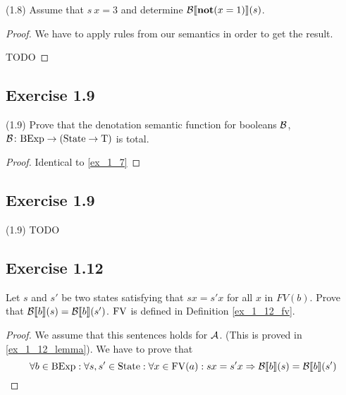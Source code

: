 \documentclass[12pt,a4paper,oneside]{book}
\begin{document}
\begin{exercise}{(1.8)}
    Assume that $s\ x = 3$ and determine $\mathcal{B} \llbracket \mathop{\textbf{\textup{not}}}(x = 1) \rrbracket (s)$.
    
    \begin{proof}
        We have to apply rules from our semantics in order to get the result.
        
        TODO
    \end{proof}
\end{exercise}

\subsection{Exercise 1.9}

\begin{exercise}{(1.9)}
    Prove that the denotation semantic function for booleans $\mathcal{B}$, $\mathord{\mathcal{B}}\colon\mathrm{BExp}\to(\mathrm{State} \to \mathrm{T})$ is total.
    
    \begin{proof}
        Identical to \ref{ex_1_7}
    \end{proof}
\end{exercise}

\subsection{Exercise 1.9}

\begin{exercise}{(1.9)}
    TODO
\end{exercise}

\subsection{Exercise 1.12}

\begin{exercise}
    Let $s$ and $s'$ be two states satisfying that $s x = s' x$ for all $x$ in $FV(b)$. Prove that $\mathcal{B} \llbracket b \rrbracket (s) = \mathcal{B} \llbracket b \rrbracket (s')$. $\mathrm{FV}$ is defined in Definition \ref{ex_1_12_fv}.
    
    \begin{proof}
        We assume that this sentences holds for $\mathcal{A}$. (This is proved in \ref{ex_1_12_lemma}). We have to prove that
        \[
        \forall b \in \mathrm{BExp} \mathrel{:} \forall s, s' \in \mathrm{State} \mathrel{:} \forall x \in \mathrm{FV}(a) \mathrel{:} sx = s'x \Rightarrow \mathcal{B} \llbracket b \rrbracket (s) = \mathcal{B} \llbracket b \rrbracket (s')
        \]
        
    \end{proof}
    
\end{exercise}
\end{document}
